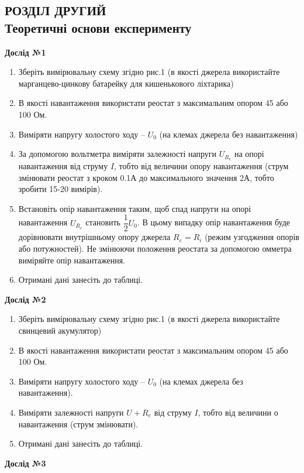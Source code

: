 \documentclass[a4paper,12pt]{article}
\newcommand{\ri}{R_i}
\newcommand{\re}{R_e}
\newcommand{\uo}{U_0}
\begin{document}
\newpage
	\begin{center}
		\section* {РОЗДІЛ ДРУГИЙ\\Теоретичні основи експерименту}
	\end{center}
	\textbf{Дослід №1 }
	\begin{enumerate}
		\item Зберіть вимірювальну схему згідно рис.1 (в якості джерела використайте марганцево-цинкову батарейку для кишенькового ліхтарика) 
		\item В якості навантаження використати реостат з максимальним опором 45 або 100 Ом. 
		\item Виміряти напругу холостого ходу – $\uo$ (на клемах джерела без навантаження) 
		\item За допомогою вольтметра виміряти залежності напруги $U_{\re}$ на опорі навантаження від струму $I$, тобто від величини опору навантаження (струм змінювати реостат з кроком 0.1А до максимального значення 2А, тобто зробити 15-20 вимірів). 
		\item Встановіть опір навантаження таким, щоб спад напруги на опорі навантаження $U_{\re}$
		становить $\dfrac{1}{2}\uo$. В цьому випадку опір навантаження буде дорівнювати внутрішньому опору джерела $\re=\ri$ (режим узгодження опорів або потужностей). Не змінюючи положення реостата за допомогою омметра виміряйте опір навантаження. 
		\item Отримані дані занесіть до таблиці. 
	\end{enumerate}
	\textbf{Дослід №2} 
	\begin{enumerate}
		\item Зберіть вимірювальну схему згідно рис.1 (в якості джерела використайте свинцевий акумулятор)  
		\item В якості навантаження використати реостат з максимальним опором 45 або 100 Ом. 
		\item Виміряти напругу холостого ходу – $\uo$ (на клемах джерела без навантаження). 
		\item Виміряти залежності напруги $U+{\re}$ від струму $I$, тобто від величини о навантаження (струм змінювати). 
		\item Отримані дані занесіть до таблиці. 
	\end{enumerate}
	\textbf{Дослід №3} 
\end{document}
